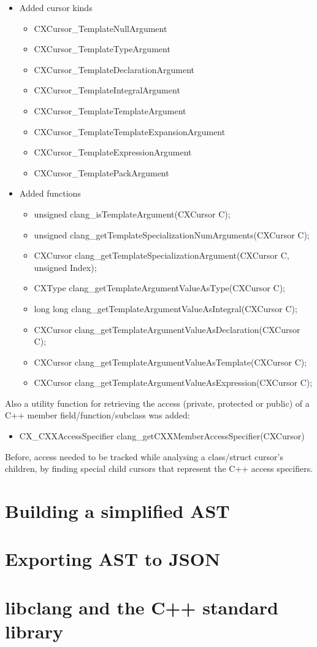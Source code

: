 \begin{itemize}\addtolength{\itemsep}{-0.5\baselineskip}
\item Added cursor kinds\begin{itemize}\addtolength{\itemsep}{-0.5\baselineskip}
	\item CXCursor\_TemplateNullArgument
	\item CXCursor\_TemplateTypeArgument
	\item CXCursor\_TemplateDeclarationArgument
	\item CXCursor\_TemplateIntegralArgument
	\item CXCursor\_TemplateTemplateArgument
	\item CXCursor\_TemplateTemplateExpansionArgument
	\item CXCursor\_TemplateExpressionArgument
	\item CXCursor\_TemplatePackArgument
	\end{itemize}
\item Added functions\begin{itemize}\addtolength{\itemsep}{-0.5\baselineskip}
	\item unsigned clang\_isTemplateArgument(CXCursor C);
	\item unsigned clang\_getTemplateSpecializationNumArguments(CXCursor C);
	\item CXCursor clang\_getTemplateSpecializationArgument(CXCursor C, unsigned Index);
	\item CXType clang\_getTemplateArgumentValueAsType(CXCursor C);
	\item long long clang\_getTemplateArgumentValueAsIntegral(CXCursor C);
	\item CXCursor clang\_getTemplateArgumentValueAsDeclaration(CXCursor C);
	\item CXCursor clang\_getTemplateArgumentValueAsTemplate(CXCursor C);
	\item CXCursor clang\_getTemplateArgumentValueAsExpression(CXCursor C);
	\end{itemize}
\end{itemize}

Also a utility function for retrieving the access (private, protected or public) of a C++ member field/function/subclass was added:
\begin{itemize}\addtolength{\itemsep}{-0.5\baselineskip}
\item CX\_CXXAccessSpecifier clang\_getCXXMemberAccessSpecifier(CXCursor)
\end{itemize}

Before, access needed to be tracked while analysing a class/struct cursor's children, by finding special child cursors that represent the C++ access specifiers.

\section{Building a simplified AST}

\section{Exporting AST to JSON}

\section{libclang and the C++ standard library}

